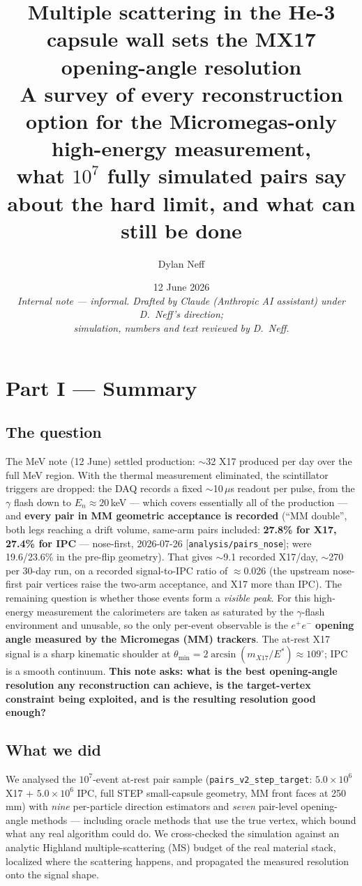 \documentclass[11pt,a4paper]{article}
\title{\vspace{-1.2cm}
  {\Large\bfseries Multiple scattering in the He-3 capsule wall sets the
   MX17 opening-angle resolution}\\[2mm]
  {\large A survey of every reconstruction option for the Micromegas-only
   high-energy measurement, \\ what $10^{7}$ fully simulated pairs say about
   the hard limit, and what can still be done}}
\author{Dylan Neff}
\date{12 June 2026 \\[2mm]
  {\small\itshape Internal note --- informal. Drafted by Claude (Anthropic AI
  assistant) under D.~Neff's direction; \\ simulation, numbers and text
  reviewed by D.~Neff.}}
\begin{document}
\maketitle

\section*{Part I --- Summary}

\subsection*{The question}
The MeV note (12 June) settled production: $\sim$32 X17 produced per day
over the full MeV region. With the thermal measurement eliminated, the
scintillator triggers are dropped: the DAQ records a fixed
$\sim$10\,$\mu$s readout per pulse, from the $\gamma$ flash down to
$E_n \approx 20$\,keV --- which covers essentially all of the production
--- and \textbf{every pair in MM geometric acceptance is recorded}
(``MM double'', both legs reaching a drift volume, same-arm pairs
included: \textbf{27.8\% for X17, 27.4\% for IPC} --- nose-first, 2026-07-26
[\texttt{analysis/pairs\_nose}]; were 19.6/23.6\% in the pre-flip geometry).
That gives $\sim$9.1 recorded X17/day, $\sim$270 per 30-day run, on a
recorded signal-to-IPC ratio of $\approx$0.026 (the upstream nose-first pair
vertices raise the two-arm acceptance, and X17 more than IPC). The remaining question is whether those events form a
\emph{visible peak}. For this high-energy measurement the calorimeters are
taken as saturated by the $\gamma$-flash environment and unusable, so the
only per-event observable is the $e^+e^-$ \textbf{opening angle measured
by the Micromegas (MM) trackers}.
The at-rest X17 signal is a sharp kinematic shoulder at
$\theta_{\min} = 2\arcsin(m_{X17}/E^{*}) \approx 109^{\circ}$; IPC is a smooth
continuum. \textbf{This note asks: what is the best opening-angle resolution
any reconstruction can achieve, is the target-vertex constraint being
exploited, and is the resulting resolution good enough?}

\subsection*{What we did}
We analysed the $10^{7}$-event at-rest pair sample
(\texttt{pairs\_v2\_step\_target}: $5.0\times10^{6}$ X17 +
$5.0\times10^{6}$ IPC, full STEP small-capsule geometry, MM front faces at
250\,mm) with \emph{nine} per-particle direction estimators and \emph{seven}
pair-level opening-angle methods --- including oracle methods that use the
true vertex, which bound what any real algorithm could do. We cross-checked
the simulation against an analytic Highland multiple-scattering (MS) budget
of the real material stack, localized where the scattering happens, and
propagated the measured resolution onto the signal shape.
\end{document}
